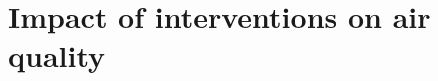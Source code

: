 \chapter{Impact of interventions on air quality} \label{chap3}
\renewcommand{\headrulewidth}{0pt}
\lhead[\thepage]{\rightmark}
\rhead[\rightmark]{\thepage}
\cfoot[]{}


